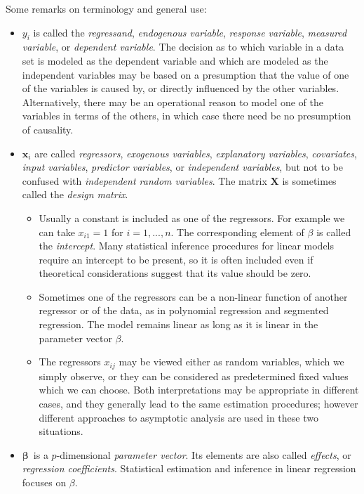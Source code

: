 Some remarks on terminology and general use:
\begin{itemize}     
  \item $y_i$  is called the \emph{regressand}, \emph{endogenous variable}, \emph{response variable}, \emph{measured variable}, or \emph{dependent variable}.  The decision as to which variable in a data set is modeled as the dependent variable and which are modeled as the independent variables may be based on a presumption that the value of one of the variables is caused by, or directly influenced by the other variables. Alternatively, there may be an operational reason to model one of the variables in terms of the others, in which case there need be no presumption of causality.
  \item $\mathbf{x}_i$ are called \emph{regressors}, \emph{exogenous variables}, \emph{explanatory variables}, \emph{covariates}, \emph{input variables}, \emph{predictor variables}, or \emph{independent variables}, but not to be confused with \emph{independent random variables}. The matrix $\mathbf{X}$ is sometimes called the \emph{design matrix}.
      \begin{itemize}
        \item Usually a constant is included as one of the regressors. For example we can take $x_{i1}=1$ for $i=1,...,n$. The corresponding element of $\beta$ is called the \emph{intercept}. Many statistical inference procedures for linear models require an intercept to be present, so it is often included even if theoretical considerations suggest that its value should be zero.
        \item Sometimes one of the regressors can be a non-linear function of another regressor or of the data, as in polynomial regression and segmented regression. The model remains linear as long as it is linear in the parameter vector $\beta$.
        \item The regressors $x_{ij}$ may be viewed either as random variables, which we simply observe, or they can be considered as predetermined fixed values which we can choose. Both interpretations may be appropriate in different cases, and they generally lead to the same estimation procedures; however different approaches to asymptotic analysis are used in these two situations.
         \end{itemize}
  \item $\boldsymbol\beta\,$ is a $p$-dimensional \emph{parameter vector}. Its elements are also called \emph{effects}, or \emph{regression coefficients}. Statistical estimation and inference in linear regression focuses on $\beta$.

\end{itemize}
